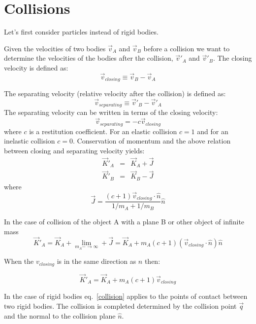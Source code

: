 \documentclass[12pt]{article}
\begin{document}
\section{Collisions}

Let's first consider particles instead of rigid bodies.

Given the velocities of two bodies $\vec v_A$ and $\vec v_B$ before a collision we want to determine the velocities of the bodies after the collision, $\vec v'_A$ and $\vec v'_B$. The closing velocity is defined as:
\begin{equation}
\vec v_{closing} \equiv \vec v_B - \vec v_A
\end{equation}

The separating velocity (relative velocity after the collision) is defined as:
\begin{equation}
\vec v_{separating} \equiv \vec v'_B - \vec v'_A
\end{equation}
The separating velocity can be written in terms of the closing velocity:
\begin{equation}
\vec v_{separating} = -c \vec v_{closing}
\label{collision}
\end{equation}
where $c$ is a restitution coefficient. For an elastic collision $c=1$ and for an inelastic collision $c=0$.
Conservation of momentum and the above relation between closing and separating velocity yields:
\begin{eqnarray}
\vec K'_A &=& \vec K_A + \vec J \\
\vec K'_B &=& \vec K_B - \vec J 
\end{eqnarray}
where
\begin{equation}
\vec J = \frac{(c+1)\vec v_{closing} \cdot \hat n}{1/m_A+1/m_B} \hat n
\end{equation}

In the case of collision of the object A with a plane B or other object of infinite mass
\begin{equation}
\vec K'_A = \vec K_A + \lim_{m_A-\rightarrow \infty} + \vec J = \vec K_A + m_A (c+1) (\vec v_{closing} \cdot \hat n) \hat n
\end{equation}

When the $v_{closing}$ is in the same direction as $n$ then:

\begin{equation}
\vec K'_A = \vec K_A + m_A (c+1) \vec v_{closing}
\end{equation}

In the case of rigid bodies eq.~\ref{collision} applies to the points of contact between two rigid bodies.  The collision is completed determined by the collision point $\vec q$ and the normal to the collision plane $\hat n$.
\end{document}
